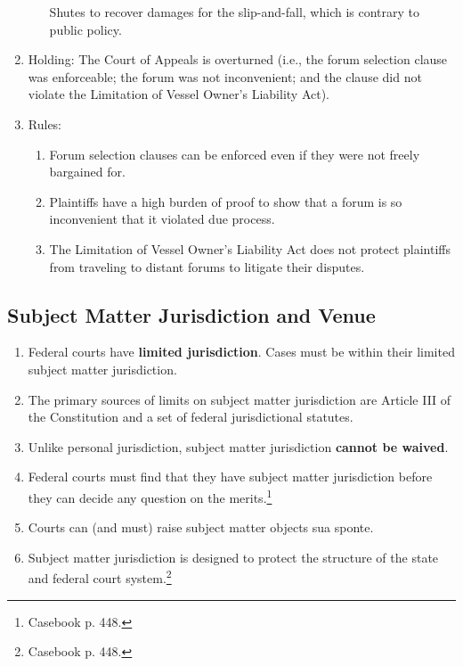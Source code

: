 \begin{enumerate}
\begin{enumerate}
        Shutes to recover damages for the slip-and-fall, which is contrary to 
        public policy.
    \end{enumerate}
    \item Holding: The Court of Appeals is overturned (i.e., the forum 
    selection clause was enforceable; the forum was not inconvenient; and the 
    clause did not violate the Limitation of Vessel Owner's Liability Act).
    \item Rules:
    \begin{enumerate}
        \item Forum selection clauses can be enforced even if they were not 
        freely bargained for.
        \item Plaintiffs have a high burden of proof to show that a forum is 
        so inconvenient that it violated due process.
        \item The Limitation of Vessel Owner's Liability Act does not protect 
        plaintiffs from traveling to distant forums to litigate their 
        disputes.
    \end{enumerate}
\end{enumerate}

\subsection{Subject Matter Jurisdiction and Venue}

\begin{enumerate}
    \item Federal courts have \textbf{limited jurisdiction}. Cases must be 
    within their limited subject matter jurisdiction.
    \item The primary sources of limits on subject matter jurisdiction are 
    Article III of the Constitution and a set of federal jurisdictional 
    statutes.
    \item Unlike personal jurisdiction, subject matter jurisdiction 
    \textbf{cannot be waived}.
    \item Federal courts must find that they have subject matter jurisdiction 
    before they can decide any question on the merits.\footnote{Casebook p.  
    448.}
    \item Courts can (and must) raise subject matter objects sua sponte.
    \item Subject matter jurisdiction is designed to protect the structure of 
    the state and federal court system.\footnote{Casebook p. 448.}
\end{enumerate}


